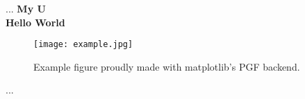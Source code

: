 \documentclass{article}
\begin{document}
...
\textbf{\huge My U \\}
\vspace{1cm}
\textbf{\Large Hello World \\}

\begin{figure}
	\texttt{[image: example.jpg]}
	\caption{Example figure proudly made with matplotlib's PGF backend.}
\end{figure}
...
\end{document}
